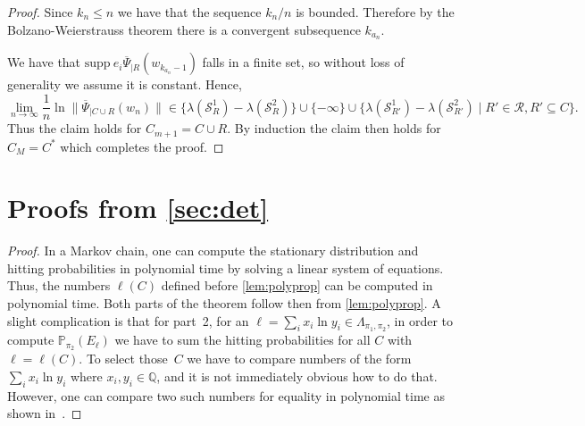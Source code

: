 \documentclass[a4paper,UKenglish,cleveref, autoref,mathscr]{lipics-v2019}
\newcommand{\QQ}{\mathbb{Q}}
\newcommand{\PP}{\mathbb{P}}
\newcommand{\1}{\mathbbm{1}}
\newcommand{\supp}{\mathrm{supp}}
\begin{document}
\begin{proof}
Since $k_n \leq n$ we have that the sequence $k_n / n$ is bounded. Therefore by the Bolzano-Weierstrauss theorem there is a convergent subsequence $k_{a_n}$. 



We have that $\supp~ e_i \overline{\Psi}_{|R}(w_{k_{a_n}-1})$ falls in a finite set, so without loss of generality we assume it is constant. 
Hence, 
\begin{equation*}
\lim_{n \rightarrow \infty} \frac1n \ln \|\overline{\Psi}_{|C \cup R}(w_n)\| \in \{\lambda(\mathcal{S}^1_R) - \lambda(\mathcal{S}^2_R) \} \cup \{-\infty\} \cup \{\lambda(\mathcal{S}^1_{R'}) - \lambda(\mathcal{S}^2_{R'}) \mid R' \in \mathcal{R}, R' \subseteq C\}.
\end{equation*}
Thus the claim holds for $C_{m+1} = C \cup R$. By induction the claim then holds for $C_M = C^*$ which completes the proof. 
\end{proof}

\section{Proofs from \cref{sec:det}} \label{app:det}

\thmdet*
\begin{proof}
In a Markov chain, one can compute the stationary distribution and hitting probabilities in polynomial time by solving a linear system of equations.
Thus, the numbers $\ell(C)$ defined before \cref{lem:polyprop} can be computed in polynomial time.
Both parts of the theorem follow then from \cref{lem:polyprop}.
A slight complication is that for part~2, for an $\ell = \sum_i x_i \ln y_i \in \Lambda_{\pi_1,\pi_2}$, in order to compute $\PP_{\pi_2}(E_\ell)$ we have to sum the hitting probabilities for all $C$ with $\ell = \ell(C)$.
To select those~$C$ we have to compare numbers of the form $\sum_i x_i \ln y_i$ where $x_i,y_i \in \QQ$, and it is not immediately obvious how to do that.
However, one can compare two such numbers for equality in polynomial time as shown in~\cite{EtessamiSY14}.
\end{proof}
\end{document}
